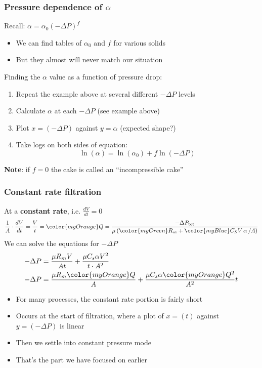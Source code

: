 \begin{frame}\frametitle{Pressure dependence of $\alpha$}
	Recall: $\alpha = \alpha_\text{0} \left(-\Delta P\right)^f$
	\begin{itemize}
		\item	We can find tables of $\alpha_\text{0}$ and $f$ for various solids
		\item	But they almost will never match our situation
	\end{itemize}
	
	
	\vspace{12pt}
	Finding the $\alpha$ value as a function of pressure drop:
	\begin{enumerate}
		\item	Repeat the example above at several different $-\Delta P$ levels
		\item	Calculate $\alpha$ at each $-\Delta P$ \hfill {\color{myOrange}(see example above)}
		\item	Plot $x=(-\Delta P)$ against $y = \alpha$ \hfill {\color{myOrange}(expected shape?)}
		\item	Take logs on both sides of equation:
		\[
			\ln{\left(\alpha\right)} = \ln{\left(\alpha_\text{0}\right)} + f \ln{\left(-\Delta P\right)}
		\]
	\end{enumerate}
	\textbf{Note}: if $f=0$ the cake is called an ``{\color{purple}incompressible cake}''
\end{frame}

\begin{frame}\frametitle{Constant rate filtration}
	At a \textbf{constant rate}, i.e. $\frac{dV}{dt} = 0$
	\[ \dfrac{1}{A} \cdot \dfrac{dV}{dt} = \dfrac{V}{t} = {\color{myOrange}Q} = \dfrac{-\Delta P_\text{tot}}{\mu \left({\color{myGreen}R_m} + {\color{myBlue}C_S V  \, \mathbf{ \alpha}\, / A} \right)}	
	\]
	We can solve the equations for $-\Delta P$
	\begin{align*}
		-\Delta P &= \dfrac{\mu R_m V}{A t} + \dfrac{\mu C_s \alpha V^2}{t \cdot A^2}\\
		-\Delta P &= \dfrac{\mu R_m {\color{myOrange}Q}}{A} + \dfrac{\mu C_s \alpha {\color{myOrange}Q^2}}{A^2}t
	\end{align*}
	\begin{itemize}
		\item	For many processes, the constant rate portion is fairly short
		\item	Occurs at the start of filtration, where a plot of $x = (t)$ against $y = (-\Delta P)$ is linear
		\item	Then we settle into constant pressure mode
		\item	That's the part we have focused on earlier
	\end{itemize}
\end{frame}

